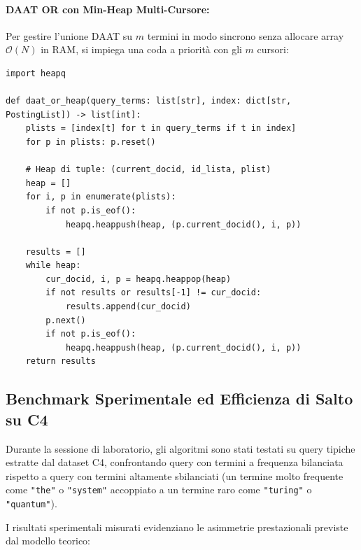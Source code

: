 \paragraph{DAAT OR con Min-Heap Multi-Cursore:}
Per gestire l'unione DAAT su $m$ termini in modo sincrono senza allocare array $\mathcal{O}(N)$ in RAM, si impiega una coda a priorit\`a con gli $m$ cursori:
\begin{lstlisting}[style=pythoncode, caption={Algoritmo DAAT OR multi-cursore con Min-Heap in Python.}, label={lst:python-daat-or-heap}]
import heapq

def daat_or_heap(query_terms: list[str], index: dict[str, PostingList]) -> list[int]:
    plists = [index[t] for t in query_terms if t in index]
    for p in plists: p.reset()
    
    # Heap di tuple: (current_docid, id_lista, plist)
    heap = []
    for i, p in enumerate(plists):
        if not p.is_eof():
            heapq.heappush(heap, (p.current_docid(), i, p))
            
    results = []
    while heap:
        cur_docid, i, p = heapq.heappop(heap)
        if not results or results[-1] != cur_docid:
            results.append(cur_docid)
        p.next()
        if not p.is_eof():
            heapq.heappush(heap, (p.current_docid(), i, p))
    return results
\end{lstlisting}

\FloatBarrier
\subsection{Benchmark Sperimentale ed Efficienza di Salto su C4}
\label{subsec:python-c4-benchmark}
Durante la sessione di laboratorio, gli algoritmi sono stati testati su query tipiche estratte dal dataset C4, confrontando query con termini a frequenza bilanciata rispetto a query con termini altamente sbilanciati (un termine molto frequente come \texttt{"the"} o \texttt{"system"} accoppiato a un termine raro come \texttt{"turing"} o \texttt{"quantum"}).

I risultati sperimentali misurati evidenziano le asimmetrie prestazionali previste dal modello teorico:

